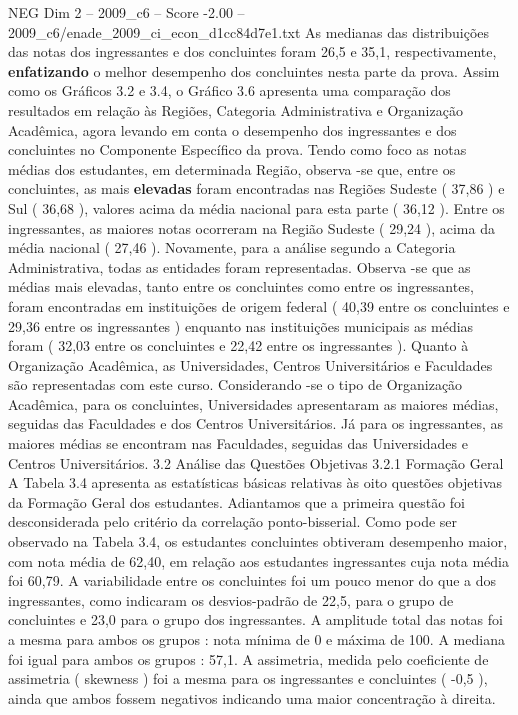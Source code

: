 \begin{textsample}{NEG Dim 2 – 2009\_c6 – Score -2.00 – 2009\_c6/enade\_2009\_ci\_econ\_d1cc84d7e1.txt}
As medianas das distribuições das notas dos ingressantes e dos concluintes foram 26,5 e 35,1, respectivamente, \textbf{enfatizando} o melhor desempenho dos concluintes nesta parte da prova.
Assim como os Gráficos 3.2 e 3.4, o Gráfico 3.6 apresenta uma comparação dos resultados em relação às Regiões, Categoria Administrativa e Organização Acadêmica, agora levando em conta o desempenho dos ingressantes e dos concluintes no Componente Específico da prova.
Tendo como foco as notas médias dos estudantes, em determinada Região, observa -se que, entre os concluintes, as mais \textbf{elevadas} foram encontradas nas Regiões Sudeste ( 37,86 ) e Sul ( 36,68 ), valores acima da média nacional para esta parte ( 36,12 ).
Entre os ingressantes, as maiores notas ocorreram na Região Sudeste ( 29,24 ), acima da média nacional ( 27,46 ).
Novamente, para a análise segundo a Categoria Administrativa, todas as entidades foram representadas.
Observa -se que as médias mais elevadas, tanto entre os concluintes como entre os ingressantes, foram encontradas em instituições de origem federal ( 40,39 entre os concluintes e 29,36 entre os ingressantes ) enquanto nas instituições municipais as médias foram ( 32,03 entre os concluintes e 22,42 entre os ingressantes ).
Quanto à Organização Acadêmica, as Universidades, Centros Universitários e Faculdades são representadas com este curso.
Considerando -se o tipo de Organização Acadêmica, para os concluintes, Universidades apresentaram as maiores médias, seguidas das Faculdades e dos Centros Universitários.
Já para os ingressantes, as maiores médias se encontram nas Faculdades, seguidas das Universidades e Centros Universitários. 3.2 Análise das Questões Objetivas 3.2.1 Formação Geral A Tabela 3.4 apresenta as estatísticas básicas relativas às oito questões objetivas da Formação Geral dos estudantes.
Adiantamos que a primeira questão foi desconsiderada pelo critério da correlação ponto-bisserial.
Como pode ser observado na Tabela 3.4, os estudantes concluintes obtiveram desempenho maior, com nota média de 62,40, em relação aos estudantes ingressantes cuja nota média foi 60,79.
A variabilidade entre os concluintes foi um pouco menor do que a dos ingressantes, como indicaram os desvios-padrão de 22,5, para o grupo de concluintes e 23,0 para o grupo dos ingressantes.
A amplitude total das notas foi a mesma para ambos os grupos : nota mínima de 0 e máxima de 100.
A mediana foi igual para ambos os grupos : 57,1.
A assimetria, medida pelo coeficiente de assimetria ( skewness ) foi a mesma para os ingressantes e concluintes ( -0,5 ), ainda que ambos fossem negativos indicando uma maior concentração à direita.

\end{textsample}
